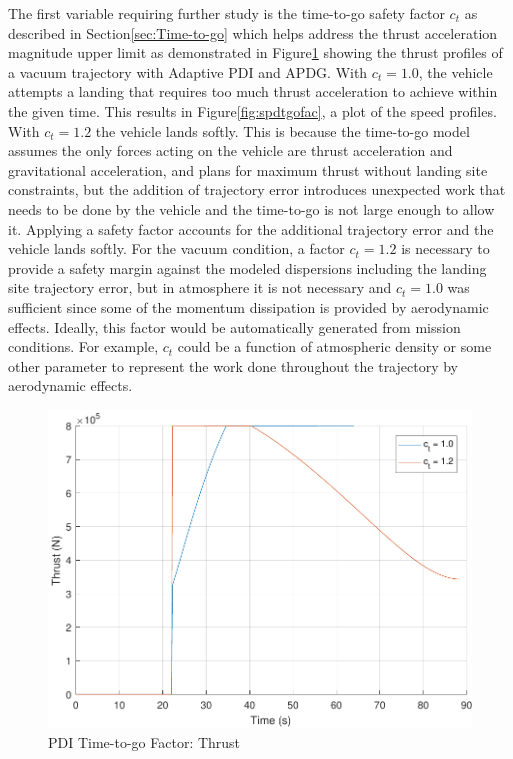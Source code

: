 The first variable requiring further study is the time-to-go safety factor $c_t$ as described in Section\:\ref{sec:Time-to-go} which helps address the thrust acceleration magnitude upper limit as demonstrated in Figure\:\ref{fig:thrtgofac} showing the thrust profiles of a vacuum trajectory with Adaptive PDI and APDG. With $c_t = 1.0$, the vehicle attempts a landing that requires too much thrust acceleration to achieve within the given time. This results in Figure\:\ref{fig:spdtgofac}, a plot of the speed profiles. With $c_t = 1.2$ the vehicle lands softly. This is because the time-to-go model assumes the only forces acting on the vehicle are thrust acceleration and gravitational acceleration, and plans for maximum thrust without landing site constraints, but the addition of trajectory error introduces unexpected work that needs to be done by the vehicle and the time-to-go is not large enough to allow it. Applying a safety factor accounts for the additional trajectory error and the vehicle lands softly. For the vacuum condition, a factor $c_t = 1.2$ is necessary to provide a safety margin against the modeled dispersions including the landing site trajectory error, but in atmosphere it is not necessary and $c_t = 1.0$ was sufficient since some of the momentum dissipation is provided by aerodynamic effects. Ideally, this factor would be automatically generated from mission conditions. For example, $c_t$ could be a function of atmospheric density or some other parameter to represent the work done throughout the trajectory by aerodynamic effects.

\begin{figure}[H]
	\centering
	\begin{minipage}{4.3 in}
		\includegraphics[width=\linewidth]{Figures/thrtgofac.pdf}
		\caption{PDI Time-to-go Factor: Thrust \label{fig:thrtgofac} }
	\end{minipage}
\end{figure}

